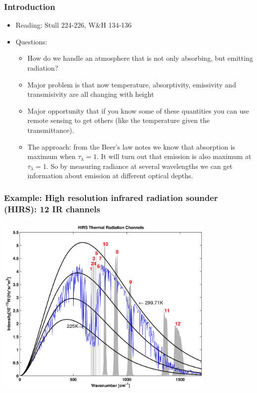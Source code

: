 \documentclass[hyperref={colorlinks=true,linkcolor=blue,urlcolor=blue},numbers]{beamer}
\begin{document}
\begin{frame}
  \frametitle{ Introduction}

  \begin{itemize}


  \item  Reading:  Stull 224-226, W\&H 134-136


  \item Questions:
    \begin{itemize}

  \item How do we handle an atmosphere that is not only absorbing, but emitting radiation?
  \item Major problem is that now temperature, absorptivity, emissivity and  transmisivity
are all changing with height
\item Major opportunity that if you know some of these quantities you can use remote sensing
to get others (like the temperature given the transmittance).
\item The approach:  from the Beer's law notes we know that absorption is maximum when
$\tau_\lambda = 1$.  It will turn out that emission is also maximum at $\tau_\lambda = 1$.
So by measuring radiance at several wavelengths we can get information about emission
at different optical depths.

    \end{itemize}

  \end{itemize}


\end{frame}

\begin{frame}
  \frametitle{ Example: High resolution infrared radiation sounder (HIRS): 12 IR channels}

\includegraphics[width=0.8\textwidth]{planck1_full.png}
\end{frame}
\end{document}
